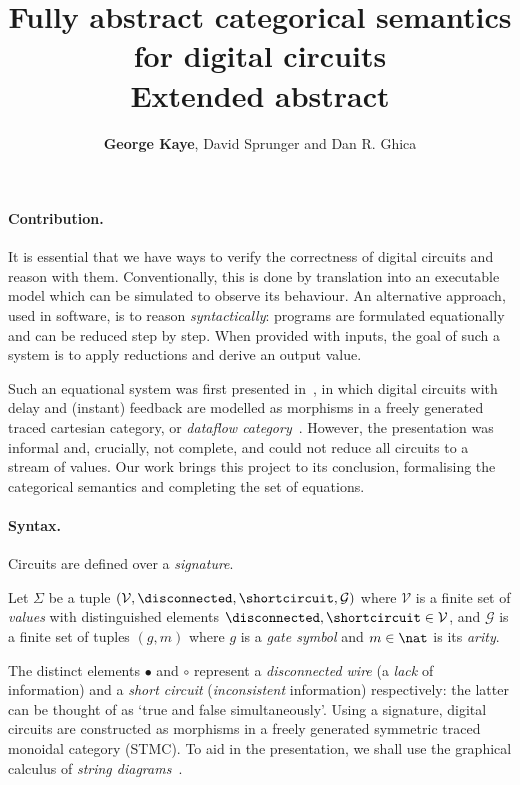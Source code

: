 \documentclass[10pt]{article}
\title{\vspace{-3em}Fully abstract categorical semantics for digital circuits\\\textbf{Extended abstract}}
\author{\textbf{George Kaye}, David Sprunger and Dan R. Ghica}
\begin{document}
    \maketitle

    \paragraph*{Contribution.}
    It is essential that we have ways to verify the correctness of digital circuits and reason with them.
    Conventionally, this is done by translation into an executable model which can be simulated to observe its behaviour.
    An alternative approach, used in software, is to reason \emph{syntactically}: programs are formulated equationally and can be reduced step by step.
    When provided with inputs, the goal of such a system is to apply reductions and derive an output value.

    Such an equational system was first presented in~\cite{ghica2016categorical,ghica2017diagrammatic}, in which digital circuits with delay and (instant) feedback are modelled as morphisms in a freely generated traced cartesian category, or \emph{dataflow category}~\cite{cazanescu1994feedback,hasegawa1997recursion}.
    However, the presentation was informal and, crucially, not complete, and could not reduce all circuits to a stream of values.
    Our work brings this project to its conclusion, formalising the categorical semantics and completing the set of equations.

    \paragraph*{Syntax.}
    Circuits are defined over a \emph{signature}.

    \begin{definition}
        Let \(\Sigma\) be a tuple \((\mathcal{V},\disconnected,\shortcircuit,\mathcal{G})\) where \(\mathcal{V}\) is a finite set of \emph{values} with distinguished elements \(\disconnected,\shortcircuit \in \mathcal{V}\), and \(\mathcal{G}\) is a finite set of tuples \((g,m)\) where \(g\) is a \emph{gate symbol} and \(m \in \nat\) is its \emph{arity}.
    \end{definition}

    \noindent
    The distinct elements \(\bullet\) and \(\circ\) represent a \emph{disconnected wire} (a \emph{lack} of information) and a \emph{short circuit} (\emph{inconsistent} information) respectively: the latter can be thought of as `true and false simultaneously'.
    Using a signature, digital circuits are constructed as morphisms in a freely generated symmetric traced monoidal category (STMC).
    To aid in the presentation, we shall use the graphical calculus of \emph{string diagrams}~\cite{joyal1991geometry,joyal1996traced,selinger2011survey}.
\end{document}

